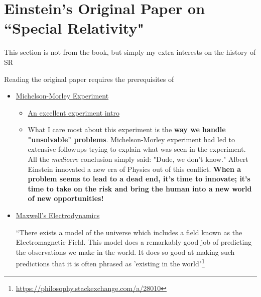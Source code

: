 \section{Einstein's Original Paper on ``Special Relativity"}

\begin{marker}
    This section is not from the book, but simply my extra interests on the history of SR
\end{marker}


Reading the original paper requires the prerequisites of

\begin{itemize}
    \item \href{https://en.wikipedia.org/wiki/Michelson\%E2\%80\%93Morley\_experiment}{Michelson-Morley Experiment}

          \begin{itemize}
              \item \href{https://youtu.be/3G_Q6AggQF8?si=ihpGM23NGq2PfsE2}{An excellent experiment intro}
              \item What I care most about this experiment is the \textbf{way we handle "unsolvable" problems}. Michelson-Morley
              experiment had led to extensive followups trying to explain what was seen in the experiment. All the
              \textit{mediocre} conclusion simply said: "Dude, we don't know." Albert Einstein innovated a new era of Physics out of this conflict. \textbf{When a problem seems to lead to a dead end, it's time to innovate; it's time to take on the risk and bring the human into a new world of new opportunities!}
          \end{itemize}

    \item \href{https://trello.com/c/SlPIXwCY}{Maxwell's Electrodynamics}

          \begin{tcolorbox}[
              colbacktitle=red!10!white,
              colback=blue!10!white,coltitle=red!70!black,
              title=Does the Electromagnetic Field \textit{physically} exist?
          ]
              ``There exists a model of the universe which includes a field known as the Electromagnetic Field. This
              model does a remarkably good job of predicting the observations we make in the world. It does so good at
              making such predictions that it is often phrased as 'existing in the
              world"\footnote{\href{https://philosophy.stackexchange.com/a/28010}{https://philosophy.stackexchange.com/a/28010}}
          \end{tcolorbox}
\end{itemize}

